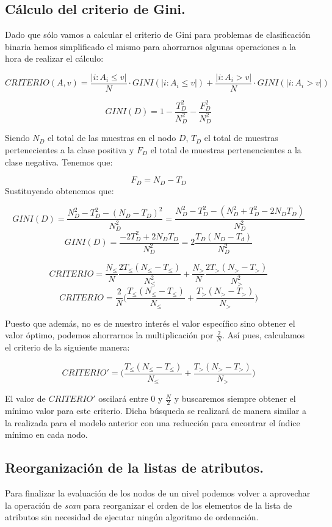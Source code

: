 \subsection{Cálculo del criterio de Gini.}
Dado que sólo vamos a calcular el criterio de Gini para problemas de clasificación binaria hemos simplificado el mismo para ahorrarnos algunas operaciones a la hora de realizar el cálculo:

$$CRITERIO(A,v) = \frac{|i: A_i \leq v|}{N} \cdot GINI(|i: A_i \leq v|) + \frac{|i: A_i > v|}{N} \cdot GINI(|i: A_i > v|)$$

$$GINI(D) = 1 - \frac{T_D^2}{N_D^2} - \frac{F_D^2}{N_D^2}$$

Siendo $N_D$ el total de las muestras en el nodo $D$, $T_D$ el total de muestras pertenecientes a la clase positiva y $F_D$ el total de muestras pertenencientes a la clase negativa. Tenemos que:

$$F_D = N_D - T_D$$
Sustituyendo obtenemos que:

$$GINI(D) = \frac{N_D^2-T_D^2- (N_D - T_D)^2}{N_D^2} = \frac{N_D^2 - T_D^2 - (N_D^2+T_D^2 - 2 N_D T_D)}{N_D^2}$$
$$GINI(D) = \frac{-2T_D^2 + 2N_DT_D}{N_D^2} = 2 \frac{T_D(N_D-T_d)}{N_D^2}$$

$$CRITERIO = \frac{N_\leq}{N}\frac{2T_\leq(N_\leq - T_\leq)}{N_\leq^2} + \frac{N_>}{N}\frac{2T_>(N_> - T_>)}{N_>^2}$$
$$CRITERIO = \frac{2}{N}\Big(\frac{T_\leq(N_\leq - T_\leq)}{N_{\leq}} + \frac{T_>(N_> - T_>)}{N_>}\Big)$$

Puesto que además, no es de nuestro interés el valor específico sino obtener el valor óptimo, podemos ahorrarnos la multiplicación por $\frac{2}{N}$. Así pues, calculamos el criterio de la siguiente manera:

$$CRITERIO' = \Big(\frac{T_\leq(N_\leq - T_\leq)}{N_{\leq}} + \frac{T_>(N_> - T_>)}{N_>}\Big)$$

El valor de $CRITERIO'$ oscilará entre 0 y $\frac{N}{2}$ y buscaremos siempre obtener el mínimo valor para este criterio. Dicha búsqueda se realizará de manera similar a la realizada para el modelo anterior con una reducción para encontrar el índice mínimo en cada nodo.

\subsection{Reorganización de la listas de atributos.}
Para finalizar la evaluación de los nodos de un nivel podemos volver a aprovechar la operación de \textit{scan} para reorganizar el orden de los elementos de la lista de atributos sin necesidad de ejecutar ningún algoritmo de ordenación.\\

